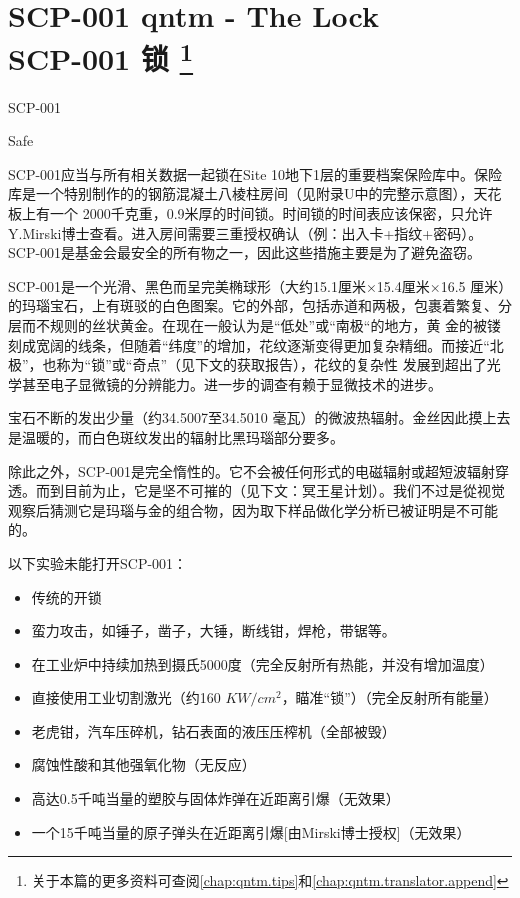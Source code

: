 \chapter[SCP-001 锁]{
	SCP-001 qntm - The Lock \\ 
	SCP-001 锁
	\protect\footnote{
		关于本篇的更多资料可查阅\autoref{chap:qntm.tips}和\autoref{chap:qntm.translator.append}
	}
}

\label{chap:SCP-001.the.lock}

SCP-001

Safe

SCP-001应当与所有相关数据一起锁在Site 10地下1层的重要档案保险库中。保险库是一个特别制作的的钢筋混凝土八棱柱房间（见附录U中的完整示意图），天花板上有一个 2000千克重，0.9米厚的时间锁。时间锁的时间表应该保密，只允许Y.Mirski博士查看。进入房间需要三重授权确认（例：出入卡+指纹+密码）。SCP-001是基金会最安全的所有物之一，因此这些措施主要是为了避免盗窃。

SCP-001是一个光滑、黑色而呈完美椭球形（大约15.1厘米×15.4厘米×16.5 厘米）的玛瑙宝石，上有斑驳的白色图案。它的外部，包括赤道和两极，包裹着繁复、分层而不规则的丝状黄金。在现在一般认为是“低处”或“南极“的地方，黄 金的被镂刻成宽阔的线条，但随着“纬度”的增加，花纹逐渐变得更加复杂精细。而接近“北极”，也称为“锁”或“奇点”（见下文的获取报告），花纹的复杂性 发展到超出了光学甚至电子显微镜的分辨能力。进一步的调查有赖于显微技术的进步。

宝石不断的发出少量（约34.5007至34.5010 毫瓦）的微波热辐射。金丝因此摸上去是温暖的，而白色斑纹发出的辐射比黑玛瑙部分要多。

除此之外，SCP-001是完全惰性的。它不会被任何形式的电磁辐射或超短波辐射穿透。而到目前为止，它是坚不可摧的（见下文：冥王星计划）。我们不过是從视觉观察后猜测它是玛瑙与金的组合物，因为取下样品做化学分析已被证明是不可能的。


以下实验未能打开SCP-001：

\begin{itemize}
	 \item 传统的开锁
	 \item 蛮力攻击，如锤子，凿子，大锤，断线钳，焊枪，带锯等。
	 \item 在工业炉中持续加热到摄氏5000度（完全反射所有热能，并没有增加温度）
	 \item 直接使用工业切割激光（约160 ${KW}/{{cm}^2}$，瞄准“锁”）（完全反射所有能量）
	 \item 老虎钳，汽车压碎机，钻石表面的液压压榨机（全部被毁）
	 \item 腐蚀性酸和其他强氧化物（无反应）
	 \item 高达0.5千吨当量的塑胶与固体炸弹在近距离引爆（无效果）
	 \item 一个15千吨当量的原子弹头在近距离引爆[由Mirski博士授权]（无效果）
\end{itemize}

